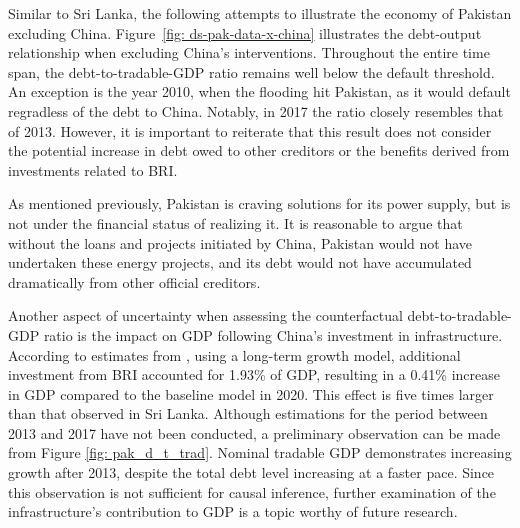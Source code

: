 Similar to Sri Lanka, the following attempts to illustrate the economy of Pakistan excluding China. Figure~\ref{fig: ds-pak-data-x-china} illustrates the debt-output relationship when excluding China's interventions. Throughout the entire time span, the debt-to-tradable-GDP ratio remains well below the default threshold. An exception is the year 2010, when the flooding hit Pakistan, as it would default regradless of the debt to China. Notably, in 2017 the ratio closely resembles that of 2013. However, it is important to reiterate that this result does not consider the potential increase in debt owed to other creditors or the benefits derived from investments related to BRI.

As mentioned previously, Pakistan is craving solutions for its power supply, but is not under the financial status of realizing it. It is reasonable to argue that without the loans and projects initiated by China, Pakistan would not have undertaken these energy projects, and its debt would not have accumulated dramatically from other official creditors.

Another aspect of uncertainty when assessing the counterfactual debt-to-tradable-GDP ratio is the impact on GDP following China's investment in infrastructure. According to estimates from \citet*{Bandiera-Vasileios-BRI-debt}, using a long-term growth model, additional investment from BRI accounted for 1.93\% of GDP, resulting in a 0.41\% increase in GDP compared to the baseline model in 2020. This effect is five times larger than that observed in Sri Lanka. Although estimations for the period between 2013 and 2017 have not been conducted, a preliminary observation can be made from Figure \ref{fig: pak_d_t_trad}. Nominal tradable GDP demonstrates increasing growth after 2013, despite the total debt level increasing at a faster pace. Since this observation is not sufficient for causal inference, further examination of the infrastructure's contribution to GDP is a topic worthy of future research.